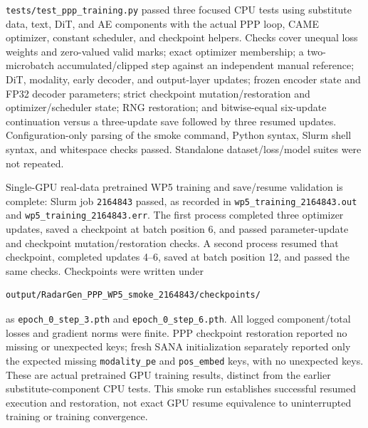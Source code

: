 \documentclass[11pt,a4paper]{article}
\begin{document}
\texttt{tests/test\_ppp\_training.py} passed three focused CPU tests using
substitute data, text, DiT, and AE components with the actual PPP loop,
CAME optimizer, constant scheduler, and checkpoint helpers. Checks cover
unequal loss weights and zero-valued valid marks; exact optimizer membership;
a two-microbatch accumulated/clipped step against an independent manual
reference; DiT, modality, early decoder, and output-layer updates;
frozen encoder state and FP32 decoder parameters; strict checkpoint
mutation/restoration and optimizer/scheduler state; RNG restoration; and
bitwise-equal six-update continuation versus a three-update save followed
by three resumed updates. Configuration-only parsing of the smoke command,
Python syntax, Slurm shell syntax, and whitespace checks passed. Standalone
dataset/loss/model suites were not repeated.

Single-GPU real-data pretrained WP5 training and save/resume validation
is complete: Slurm job \texttt{2164843} passed, as recorded in
\texttt{wp5\_training\_2164843.out} and
\texttt{wp5\_training\_2164843.err}. The first process completed three
optimizer updates, saved a checkpoint at batch position 6, and passed
parameter-update and checkpoint mutation/restoration checks. A second
process resumed that checkpoint, completed updates 4--6, saved at batch
position 12, and passed the same checks. Checkpoints were written under
\begin{lstlisting}
output/RadarGen_PPP_WP5_smoke_2164843/checkpoints/
\end{lstlisting}
as \texttt{epoch\_0\_step\_3.pth} and
\texttt{epoch\_0\_step\_6.pth}. All logged component/total losses and
gradient norms were finite. PPP checkpoint restoration reported no missing
or unexpected keys; fresh SANA initialization separately reported only the
expected missing \texttt{modality\_pe} and \texttt{pos\_embed} keys, with
no unexpected keys. These are actual pretrained GPU training results,
distinct from the earlier substitute-component CPU tests. This smoke run
establishes successful resumed execution and restoration, not exact GPU
resume equivalence to uninterrupted training or training convergence.
\end{document}
